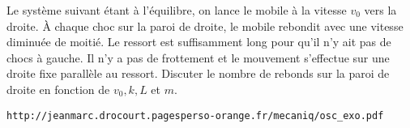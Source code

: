 \begin{Exercise}[title=Rebonds]
  Le système suivant étant à l'équilibre, on lance le mobile à la vitesse $v_0$ vers la droite. À chaque choc sur la paroi de droite, le mobile rebondit avec une vitesse diminuée de moitié. Le ressort est suffisamment long pour qu'il n'y ait pas de chocs à gauche. Il n'y a pas de frottement et le mouvement s'effectue sur une droite fixe parallèle au ressort.
  Discuter le nombre de rebonds sur la paroi de droite en fonction de $v_0, k, L$ et $m$.
\end{Exercise}
\begin{Answer}
\begin{verbatim}
http://jeanmarc.drocourt.pagesperso-orange.fr/mecaniq/osc_exo.pdf
\end{verbatim}

\end{Answer}
